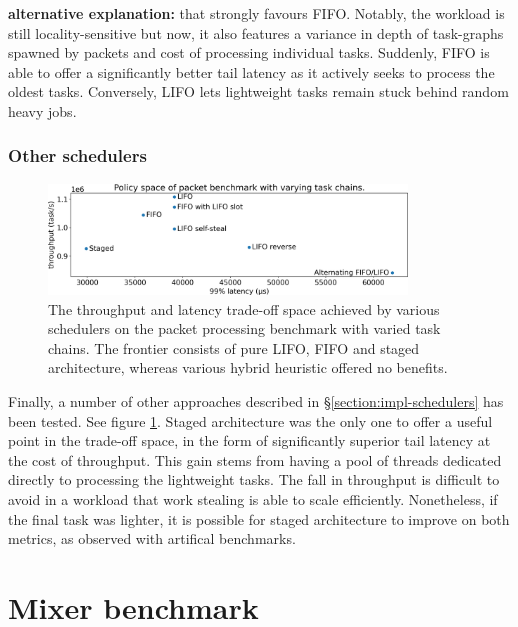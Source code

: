 \documentclass[12pt,a4paper,twoside]{report}
\begin{document}
\textbf{alternative explanation:}
that strongly favours FIFO. Notably, the workload is still locality-sensitive but now, it also features a variance in depth of task-graphs spawned by packets and cost of processing individual tasks. Suddenly, FIFO is able to offer a significantly better tail latency as it actively seeks to process the oldest tasks. Conversely, LIFO lets lightweight tasks remain stuck behind random heavy jobs. 



\subsubsection{Other schedulers}

\begin{figure} 
    \centering 
    \includegraphics[width=0.85\textwidth]{eval/packet-basic-base-hybrids.png}
    \caption{The throughput and latency trade-off space achieved by various schedulers on the packet processing benchmark with varied task chains. The frontier consists of pure LIFO, FIFO and staged architecture, whereas various hybrid heuristic offered no benefits.}
   \label{fig:packet-hybrids}
\end{figure}

Finally, a number of other approaches described in \S\ref{section:impl-schedulers} has been tested. See figure \ref{fig:packet-hybrids}. Staged architecture was the only one to offer a useful point in the trade-off space, in the form of significantly superior tail latency at the cost of throughput. This gain stems from having a pool of threads dedicated directly to processing the lightweight tasks. The fall in throughput is difficult to avoid in a workload that work stealing is able to scale efficiently. Nonetheless, if the final task was lighter, it is possible for staged architecture to improve on both metrics, as observed with artifical benchmarks. 

\section{Mixer benchmark}
\end{document}
